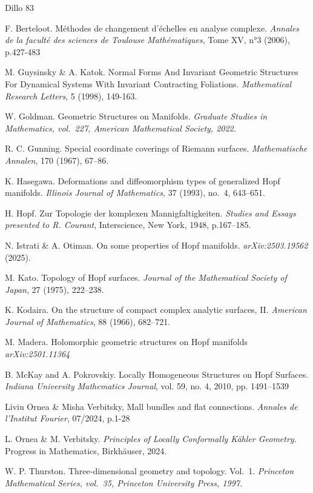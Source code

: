\documentclass[english,11pt]{amsart}
\theoremstyle{definition}
\theoremstyle{remark}
\numberwithin{equation}{section}
\begin{document}
\newpage
\begin{thebibliography}{Dillo 83}


 {\sc F. Berteloot}. M\'ethodes de changement d'\'echelles en analyse complexe. {\em Annales de la facult\'e des sciences de Toulouse Math\'ematiques}, Tome XV, n°3 (2006), p.427-483


 {\sc M. Guysinsky \& A. Katok}. Normal Forms And Invariant Geometric
Structures For Dynamical Systems
With Invariant Contracting Foliations. {\em Mathematical Research Letters}, 5 (1998), 149-163.

 {\sc W. Goldman}. Geometric Structures on Manifolds. {\em Graduate Studies in Mathematics, vol.~227, American Mathematical Society, 2022.}

 {\sc R. C. Gunning}. Special coordinate coverings of Riemann surfaces. {\em Mathematische Annalen}, 170 (1967), 67--86.

 {\sc K. Hasegawa}. Deformations and diffeomorphism types of generalized Hopf manifolds. {\em Illinois Journal of Mathematics}, 37 (1993), no.~4, 643--651.

 {\sc H. Hopf}. Zur Topologie der komplexen Mannigfaltigkeiten. {\em Studies and Essays presented to R. Courant}, Interscience, New York, 1948, p.167--185.

 {\sc N. Istrati \& A. Otiman}. On some properties of Hopf manifolds. {\em arXiv:2503.19562} (2025).

 {\sc M. Kato}. Topology of Hopf surfaces. {\em Journal of the Mathematical Society of Japan}, 27 (1975), 222--238.

 {\sc K. Kodaira}. On the structure of compact complex analytic surfaces, II. {\em American Journal of Mathematics}, 88 (1966), 682--721.

 {\sc M. Madera}. Holomorphic geometric structures on Hopf manifolds {\em arXiv:2501.11364}

 {\sc  B. McKay and A. Pokrovskiy}. Locally Homogeneous Structures on Hopf Surfaces. {\em Indiana University Mathematics Journal}, vol. 59, no. 4, 2010, pp. 1491–1539

 {\sc Liviu Ornea \& Misha Verbitsky, } Mall bundles and flat connections. {\em Annales de l'Institut Fourier}, 07/2024, p.1-28

 {\sc L. Ornea \& M. Verbitsky}. {\em Principles of Locally Conformally K\"ahler Geometry}. Progress in Mathematics, Birkh\"auser, 2024.

 {\sc W. P. Thurston}. Three-dimensional geometry and topology. Vol.~1. {\em Princeton Mathematical Series, vol.~35, Princeton University Press, 1997.}

\end{thebibliography}
\end{document}
